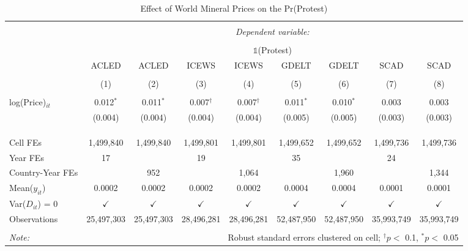 
\begin{table}[ht!] \centering 
  \caption{Effect of World Mineral Prices on the Pr(Protest)} 
  \label{tab:did_price_other} 
\begin{tabular}{@{\extracolsep{0pt}}lcccccccc} 
\\[-1.8ex]\hline 
\hline \\[-1.8ex] 
 & \multicolumn{8}{c}{\textit{Dependent variable:}} \\ 
\cline{2-9} 
\\[-1.8ex] & \multicolumn{8}{c}{$\mathbb{1}$(Protest)} \\ 
 & ACLED & ACLED & ICEWS & ICEWS & GDELT & GDELT & SCAD & SCAD \\ 
\\[-1.8ex] & (1) & (2) & (3) & (4) & (5) & (6) & (7) & (8)\\ 
\hline \\[-1.8ex] 
 log(Price)$_{it}$ & 0.012$^{*}$ & 0.011$^{*}$ & 0.007$^{\dagger}$ & 0.007$^{\dagger}$ & 0.011$^{*}$ & 0.010$^{*}$ & 0.003 & 0.003 \\ 
  & (0.004) & (0.004) & (0.004) & (0.004) & (0.005) & (0.005) & (0.003) & (0.003) \\ 
  & & & & & & & & \\ 
\hline \\[-1.8ex] 
\hline \\[-1.8ex] Cell FEs & 1,499,840 & 1,499,840 & 1,499,801 & 1,499,801 & 1,499,652 & 1,499,652 & 1,499,736 & 1,499,736 \\ 
Year FEs & 17 &  & 19 &  & 35 &  & 24 &  \\ 
Country-Year FEs &  & 952 &  & 1,064 &  & 1,960 &  & 1,344 \\ 
Mean($y_{it}$) & 0.0002 & 0.0002 & 0.0002 & 0.0002 & 0.0004 & 0.0004 & 0.0001 & 0.0001 \\ 
Var($D_{it}$) = 0 & $\checkmark$ & $\checkmark$ & $\checkmark$ & $\checkmark$ & $\checkmark$ & $\checkmark$ & $\checkmark$ & $\checkmark$ \\ 
Observations & 25,497,303 & 25,497,303 & 28,496,281 & 28,496,281 & 52,487,950 & 52,487,950 & 35,993,749 & 35,993,749 \\ 
\hline 
\hline \\[-1.8ex] 
\textit{Note:}  & \multicolumn{8}{r}{Robust standard errors clustered on cell; $^{\dagger} p <$ 0.1, $^*p <$ 0.05} \\ 
\end{tabular} 
\end{table} 
